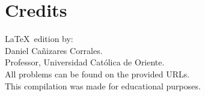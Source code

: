 \documentclass[12pt,a4paper,oneside]{article}
\begin{document}





\newpage
\section*{Credits}
\LaTeX \  edition by: \\

Daniel Ca\~nizares Corrales. \\
Professor, Universidad Cat\'olica de Oriente. \\

All problems can be found on the provided URLs. \\
This compilation was made for educational purposes.
\end{document}
